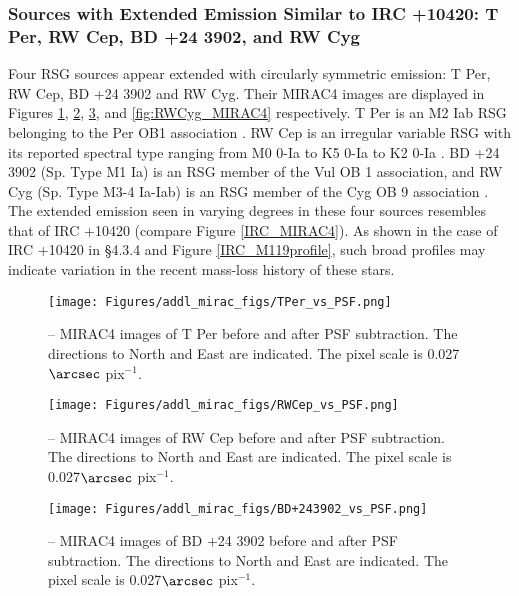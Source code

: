 \subsubsection{Sources with Extended Emission Similar to IRC +10420:  T Per, RW Cep, BD +24 3902, and RW Cyg}
Four RSG sources appear extended with circularly symmetric emission:  T Per, RW Cep, BD +24 3902 and RW Cyg.  Their MIRAC4 images are displayed in Figures \ref{fig:TPer_MIRAC4},  \ref{fig:RWCep_MIRAC4},  \ref{fig:BD+243902_MIRAC4}, and  \ref{fig:RWCyg_MIRAC4} respectively.    T Per is an M2 Iab RSG belonging to the Per OB1 association \citep{Humphreys:1978}.  RW Cep is an irregular variable RSG with its reported spectral type ranging from M0 0-Ia \citep{Merrill:1956} to K5 0-Ia \citep{Humphreys:1988} to K2 0-Ia \citep{Rayner:2009}.  BD +24 3902 (Sp. Type M1 Ia) is an RSG member of the Vul OB 1 association, and RW Cyg (Sp. Type M3-4 Ia-Iab) is an RSG member of the Cyg OB 9 association \citep{Humphreys:1988}.  The extended emission seen in varying degrees in these four sources resembles that of IRC +10420 (compare Figure \ref{IRC_MIRAC4}).   As shown in the case of IRC +10420 in \S 4.3.4 and Figure \ref{IRC_M119profile}, such broad profiles may indicate variation in the recent mass-loss history of these stars.  




\begin{figure}[htp]
\centering
\texttt{[image: Figures/addl\_mirac\_figs/TPer\_vs\_PSF.png]}	
\caption[MIRAC4 images of T Per.]{-- MIRAC4 images of T Per  before and after PSF subtraction.  The directions to North and East are indicated.  The pixel scale is 0.027$\arcsec$ pix$^{-1}$.} 
\label{fig:TPer_MIRAC4}
\end{figure} 

\begin{figure}[htp]
\centering
\texttt{[image: Figures/addl\_mirac\_figs/RWCep\_vs\_PSF.png]}	
\caption[MIRAC4 images of RW Cep.]{-- MIRAC4 images of RW Cep  before and after PSF subtraction.  The directions to North and East are indicated.  The pixel scale is 0.027$\arcsec$ pix$^{-1}$.} 
\label{fig:RWCep_MIRAC4}
\end{figure} 

\begin{figure}[htp]
\centering
\texttt{[image: Figures/addl\_mirac\_figs/BD+243902\_vs\_PSF.png]}	
\caption[MIRAC4 images of BD +24 3902.]{-- MIRAC4 images of BD +24 3902  before and after PSF subtraction.  The directions to North and East are indicated.  The pixel scale is 0.027$\arcsec$ pix$^{-1}$.} 
\label{fig:BD+243902_MIRAC4}
\end{figure} 


